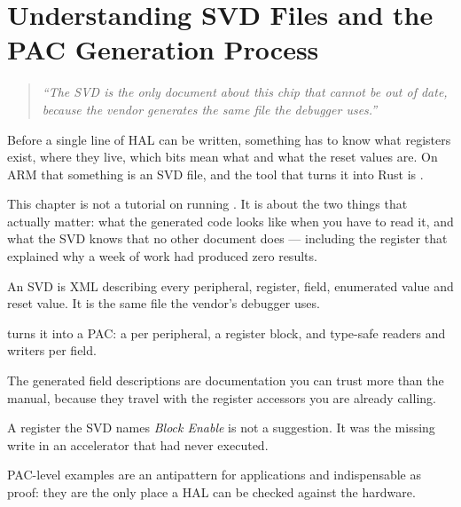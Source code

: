 
\chapter{Understanding SVD Files and the PAC Generation Process}
\label{ch:chapter-02}

\begin{quote}
    \textit{``The SVD is the only document about this chip that cannot be out of date, because the
    vendor generates the same file the debugger uses.''}
\end{quote}

Before a single line of HAL can be written, something has to know what registers exist, where they
live, which bits mean what and what the reset values are. On ARM that something is an SVD file, and
the tool that turns it into Rust is .

This chapter is not a tutorial on running . It is about the two things that
actually matter: what the generated code looks like when you have to read it, and what the SVD knows
that no other document does — including the register that explained why a week of work had produced
zero results.

\minitoc

\clearpage








\clearpage

\begin{keytakeaways}
    \item An SVD is XML describing every peripheral, register, field, enumerated value and reset
          value. It is the same file the vendor's debugger uses.
    \item {} turns it into a PAC: a  per peripheral, a
          register block, and type-safe readers and writers per field.
    \item The generated field descriptions are documentation you can trust more than the manual,
          because they travel with the register accessors you are already calling.
    \item A register the SVD names \emph{Block Enable} is not a suggestion. It was the missing write
          in an accelerator that had never executed.
    \item PAC-level examples are an antipattern for applications and indispensable as proof: they are
          the only place a HAL can be checked against the hardware.
\end{keytakeaways}
